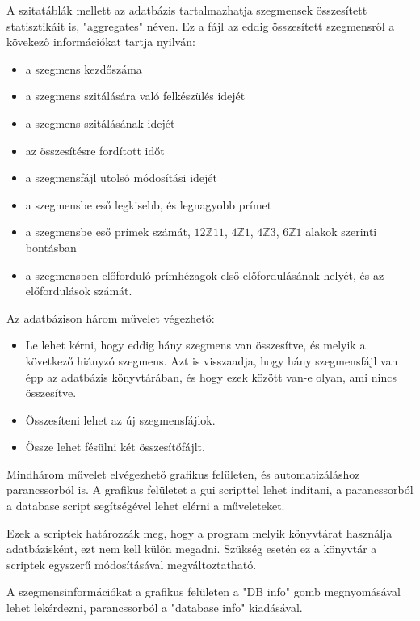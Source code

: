 \documentclass[12pt]{report}
\begin{document}
A szitatáblák mellett az adatbázis tartalmazhatja szegmensek összesített
statisztikáit is, "aggregates" néven. Ez a fájl az eddig összesített
szegmensről a kövekező információkat tartja nyilván:
\begin{itemize}
\item a szegmens kezdőszáma
\item a szegmens szitálására való felkészülés idejét
\item a szegmens szitálásának idejét
\item az összesítésre fordított időt
\item a szegmensfájl utolsó módosítási idejét
\item a szegmensbe eső legkisebb, és legnagyobb prímet
\item a szegmensbe eső prímek számát,
$12\mathbb{Z}11$, $4\mathbb{Z}1$, $4\mathbb{Z}3$, $6\mathbb{Z}1$ alakok szerinti bontásban
\item a szegmensben előforduló prímhézagok első előfordulásának helyét,
és az előfordulások számát.
\end{itemize}

Az adatbázison három művelet végezhető:
\begin{itemize}

\item Le lehet kérni, hogy eddig hány szegmens van összesítve,
és melyik a következő hiányzó szegmens.
Azt is visszaadja, hogy hány szegmensfájl van épp az adatbázis könyvtárában,
és hogy ezek között van-e olyan, ami nincs összesítve.

\item Összesíteni lehet az új szegmensfájlok.

\item Össze lehet fésülni két összesítőfájlt.

\end{itemize}

Mindhárom művelet elvégezhető grafikus felületen, és automatizáláshoz parancssorból is.
A grafikus felületet a gui scripttel lehet indítani, a parancssorból
a database script segítségével lehet elérni a műveleteket.

Ezek a scriptek határozzák meg, hogy a program melyik könyvtárat használja
adatbázisként, ezt nem kell külön megadni.
Szükség esetén ez a könyvtár a scriptek egyszerű módosításával
megváltoztatható.

A szegmensinformációkat a grafikus felületen a "DB info" gomb megnyomásával lehet
lekérdezni, parancssorból a "database info" kiadásával.
\end{document}
